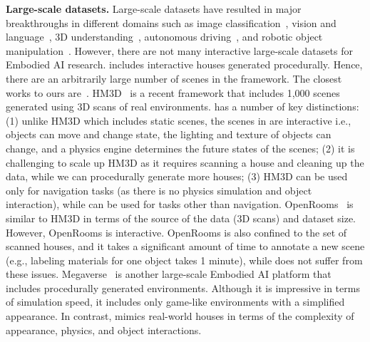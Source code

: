 \noindent \textbf{Large-scale datasets.} Large-scale datasets have resulted in major breakthroughs in different domains such as image classification~\cite{imagenet,Kuznetsova2020TheOI}, vision and language~\cite{Changpinyo2021Conceptual1P,Thomee2016YFCC100MTN}, 3D understanding~\cite{shapenet2015,Xiang2016ObjectNet3DAL}, autonomous driving~\cite{nuscenes,sun2020scalability}, and robotic object manipulation~\cite{pinto2016supersizing,mu2021maniskill}. However, there are not many interactive large-scale datasets for Embodied AI research. \env includes interactive houses generated procedurally. Hence, there are an arbitrarily large number of scenes in the framework. The closest works to ours are~\cite{Ramakrishnan2021HabitatMatterport3D,Petrenko2021MegaverseSE,li2021openrooms}. HM3D~\cite{Ramakrishnan2021HabitatMatterport3D} is a recent framework that includes 1,000 scenes generated using 3D scans of real environments. \env has a number of key distinctions: (1) unlike HM3D which includes static scenes, the scenes in \env are interactive i.e., objects can move and change state, the lighting and texture of objects can change, and a physics engine determines the future states of the scenes; (2) it is challenging to scale up HM3D as it requires scanning a house and cleaning up the data, while we can procedurally generate more houses; (3) HM3D can be used only for navigation tasks (as there is no physics simulation and object interaction), while \env can be used for tasks other than navigation. OpenRooms~\cite{li2021openrooms} is similar to HM3D in terms of the source of the data (3D scans) and dataset size. However, OpenRooms is interactive. OpenRooms is also confined to the set of scanned houses, and it takes a significant amount of time to annotate a new scene (e.g., labeling materials for one object takes 1 minute), while \env does not suffer from these issues. Megaverse~\cite{Petrenko2021MegaverseSE} is another large-scale Embodied AI platform that includes procedurally generated environments. Although it is impressive in terms of simulation speed, it includes only game-like environments with a simplified appearance. In contrast, \env mimics real-world houses in terms of the complexity of appearance, physics, and object interactions. 

